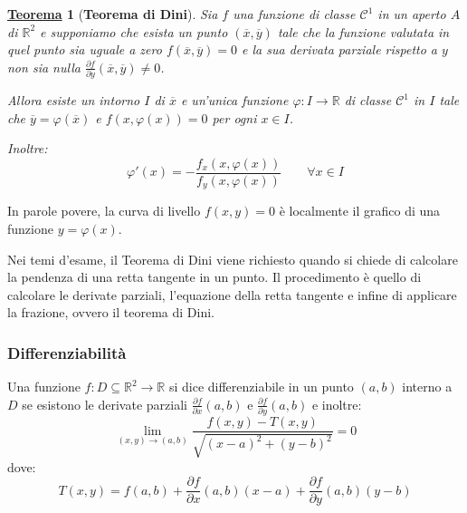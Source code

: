 \documentclass[a4paper]{article}
\newtheorem{theorem}{\textcolor{Red3}{\underline{Teorema}}}
\newcommand{\definition}[1]{\textcolor{Red3}{\textbf{#1}}}
\begin{document}
	\begin{theorem}[\definition{Teorema di Dini}]\label{theorem: teorema della funzione implicita (Ulisse Dini)}
		Sia $f$ una funzione di classe $\mathcal{C}^{1}$ in un aperto $A$ di $\mathbb{R}^{2}$ e supponiamo che esista un punto $\left(\overline{x}, \overline{y}\right)$ tale che la funzione valutata in quel punto sia uguale a zero $f\left(\overline{x}, \overline{y}\right) = 0$ e la sua derivata parziale rispetto a $y$ non sia nulla $\frac{\partial f}{\partial y}\left(\overline{x}, \overline{y}\right) \ne 0$.

		Allora esiste un intorno $I$ di $\overline{x}$ e un'unica funzione $\varphi: I \rightarrow \mathbb{R}$ di classe $\mathcal{C}^{1}$ in $I$ tale che $\overline{y}=\varphi\left(\overline{x}\right)$ e $f\left(x, \varphi\left(x\right)\right) = 0$ per ogni $x \in I$.

		\noindent
		Inoltre:
		\begin{equation}
			\varphi'\left(x\right) = - \dfrac{
				f_{x}\left(x, \varphi\left(x\right)\right)
			}{
				f_{y}\left(x, \varphi\left(x\right)\right)
			}
			\hspace{2em}
			\forall x \in I
		\end{equation}
	\end{theorem}

	\noindent
	In parole povere, la curva di livello $f\left(x,y\right) = 0$ è localmente il grafico di una funzione $y = \varphi\left(x\right)$.\newline

	\noindent
	Nei temi d'esame, il Teorema di Dini viene richiesto quando si chiede di calcolare la pendenza di una retta tangente in un punto. Il procedimento è quello di calcolare le derivate parziali, l'equazione della retta tangente e infine di applicare la frazione, ovvero il teorema di Dini.
	
	\newpage

	\subsubsection{Differenziabilità}\label{subsubsection: differenziabilità}

	\begin{boxdef}
		Una funzione $f: D\subseteq \mathbb{R}^{2} \rightarrow \mathbb{R}$ si dice differenziabile in un punto $\left(a,b\right)$ interno a $D$ se esistono le derivate parziali $\frac{\partial f}{\partial x}\left(a,b\right)$ e $\frac{\partial f}{\partial y}\left(a,b\right)$ e inoltre:
		\begin{equation}
			\displaystyle\lim_{\left(x,y\right) \rightarrow \left(a,b\right)} \dfrac{f\left(x,y\right) - T\left(x,y\right)}{\sqrt{\left(x-a\right)^{2} + \left(y-b\right)^{2}}} = 0
		\end{equation}
		dove:
		\begin{equation}\label{eq: differenziabilità}
			T\left(x,y\right) = f\left(a,b\right) + \dfrac{\partial f}{\partial x}\left(a,b\right)\left(x-a\right) + \frac{\partial f}{\partial y}\left(a,b\right)\left(y-b\right)
		\end{equation}
	\end{boxdef}
\end{document}
